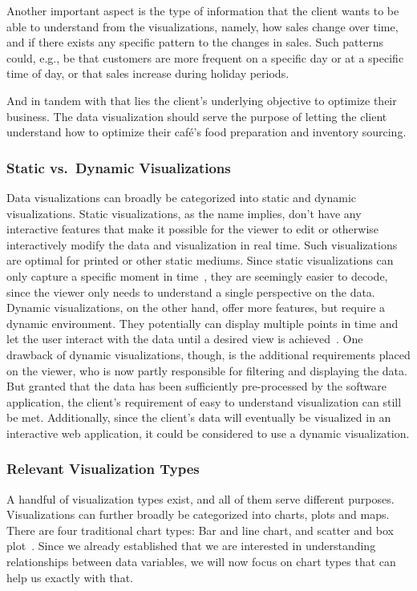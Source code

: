Another important aspect is the type of information that the client wants to be able to understand from the
visualizations, namely, how sales change over time, and if there exists any specific pattern to the changes in sales.
Such patterns could, e.g., be that customers are more frequent on a specific day or at a specific time of day, or that
sales increase during holiday periods.

And in tandem with that lies the client's underlying objective to optimize their business.
The data visualization should serve the purpose of letting the client understand how to optimize their café's food
preparation and inventory sourcing.

\subsubsection{Static vs.\ Dynamic Visualizations}\label{subsubsec:static-vs-dynamic-visualizations}
Data visualizations can broadly be categorized into static and dynamic visualizations.
Static visualizations, as the name implies, don't have any interactive features that make it possible for the viewer to
edit or otherwise interactively modify the data and visualization in real time.
Such visualizations are optimal for printed or other static mediums.
Since static visualizations can only capture a specific moment in time~\cite{wpDataTablesDynamicVisualization}, they are
seemingly easier to decode, since the viewer only needs to understand a single perspective on the data.
Dynamic visualizations, on the other hand, offer more features, but require a dynamic environment.
They potentially can display multiple points in time and let the user interact with the data until a desired view is
achieved~\cite{wpDataTablesDynamicVisualization}.
One drawback of dynamic visualizations, though, is the additional requirements placed on the viewer, who is now partly
responsible for filtering and displaying the data.
But granted that the data has been sufficiently pre-processed by the software application, the client's requirement of
easy to understand visualization can still be met.
Additionally, since the client's data will eventually be visualized in an interactive web application, it could be
considered to use a dynamic visualization.

\subsubsection{Relevant Visualization Types}\label{subsubsec:relevant-visualization-types}
A handful of visualization types exist, and all of them serve different purposes.
Visualizations can further broadly be categorized into charts, plots and maps.
There are four traditional chart types: Bar and line chart, and scatter and box plot~\cite{atlassianChartTypes}.
Since we already established that we are interested in understanding relationships between data variables, we will now
focus on chart types that can help us exactly with that.

